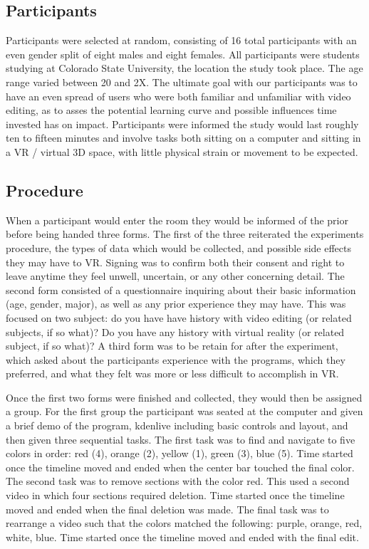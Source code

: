 \documentclass[manuscript, review]{acmart}
\begin{document}
\subsection{Participants}

Participants were selected at random, consisting of 16 total participants with an even gender split of eight males and eight females. All participants were students studying at Colorado State University, the location the study took place. The age range varied between 20 and 2X. The ultimate goal with our participants was to have an even spread of users who were both familiar and unfamiliar with video editing, as to asses the potential learning curve and possible influences time invested has on impact. Participants were informed the study would last roughly ten to fifteen minutes and involve tasks both sitting on a computer and sitting in a VR / virtual 3D space, with little physical strain or movement to be expected.

\subsection{Procedure}

When a participant would enter the room they would be informed of the prior before being handed three forms. The first of the three reiterated the experiments procedure, the types of data which would be collected, and possible side effects they may have to VR. Signing was to confirm both their consent and right to leave anytime they feel unwell, uncertain, or any other concerning detail. The second form consisted of a questionnaire inquiring about their basic information (age, gender, major), as well as any prior experience they may have. This was focused on two subject: do you have have history with video editing (or related subjects, if so what)? Do you have any history with virtual reality (or related subject, if so what)? A third form was to be retain for after the experiment, which asked about the participants experience with the programs, which they preferred, and what they felt was more or less difficult to accomplish in VR.

Once the first two forms were finished and collected, they would then be assigned a group. For the first group the participant was seated at the computer and given a brief demo of the program, kdenlive including basic controls and layout, and then given three sequential tasks. The first task was to find and navigate to five colors in order: red (4), orange (2), yellow (1), green (3), blue (5). Time started once the timeline moved and ended when the center bar touched the final color. The second task was to remove sections with the color red. This used a second video in which four sections required deletion. Time started once the timeline moved and ended when the final deletion was made. The final task was to rearrange a video such that the colors matched the following: purple, orange, red, white, blue. Time started once the timeline moved and ended with the final edit.
\end{document}
